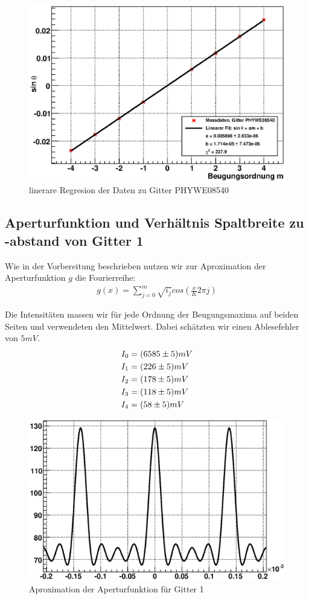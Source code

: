 \documentclass[12pt]{article}
\begin{document}
\begin{figure}[H]  
\centering
\includegraphics[width=0.7\linewidth]{pictures/phywe08540.eps}
\caption{linerare Regresion der Daten zu Gitter PHYWE08540}
\end{figure}

\subsection{Aperturfunktion und Verhältnis Spaltbreite zu -abstand von Gitter 1}

Wie in der Vorbereitung beschrieben nutzen wir zur Aproximation der Aperturfunktion $g$ die Fourierreihe:
\begin{align}
 g(x) = \sum_{j=0}^{m}{\sqrt{i_j}cos \left( \frac{x}{K} 2 \pi j \right)}
\end{align}

Die Intensitäten massen wir für jede Ordnung der Beugungsmaxima auf beiden Seiten und verwendeten den Mittelwert. Dabei schätzten wir einen Ablesefehler von $5mV$. 
\begin{align}
 \notag
I_0 &= (6585 \pm 5) mV \\
 \notag
I_1 &= (226 \pm 5) mV \\
 \notag
I_2 &= (178 \pm 5) mV \\
 \notag
I_3 &= (118 \pm 5) mV \\
 \notag
I_4 &= (58 \pm 5) mV
\end{align}

\begin{figure}[H]  
\centering
\includegraphics[width=0.7\linewidth]{pictures/apertur.eps}
\caption{Aproximation der Aperturfunktion für Gitter 1}
\end{figure}
\end{document}
